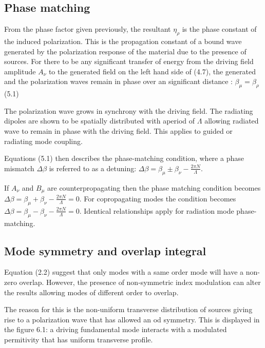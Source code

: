 \documentclass[11pt, openright]{book}
\begin{document}
         \subsection*{Phase matching}

         From the phase factor given previously, the resultant $\eta_\rho$ is the phase constant of the induced polarization. This is the propagation constant of a bound wave generated by the polarization response of the material due to the presence of sources. For there to be any significant transfer of energy from the driving field amplitude $A_\nu$ to the generated field on the left hand side of (4.7), the generated and the polarization waves remain in phase over an significant distance : $\beta_\mu = \beta_\rho$ (5.1)
         

         The polarization wave grows in synchrony with the driving field. The radiating dipoles are shown to be spatially distributed with  aperiod of $\Lambda$ allowing radiated wave to remain in phase with the driving field. This applies to guided or radiating mode coupling.

         Equations (5.1) then describes the phase-matching condition, where a phase mismatch $\Delta \beta$ is referred to as a detuning: $\Delta\beta=\beta_\mu \pm \beta_\nu - \frac{2 \pi N}{\Lambda}$.

         If $A_\nu$ and $B_\mu$ are counterpropagating then the phase matching condition becomes $\Delta\beta=\beta_\mu+\beta_\nu-\frac{2\pi N }{\Lambda}= 0$.
         For copropagating modes the condition becomes $\Delta\beta=\beta_\mu-\beta_\nu-\frac{2\pi N}{\Lambda}=0$.
         Identical relationships apply for radiation mode phase-matching.
         
          \subsection*{Mode symmetry and overlap integral}

          Equation (2.2) suggest that only modes with a same order mode will have a non-zero overlap. However, the presence of non-symmetric index modulation can alter the results allowing modes of different order to overlap.

          The reason for this is the non-uniform transverse distribution of sources giving rise to a polarization wave that has allowed an od symmetry. This is displayed in the figure 6.1: a driving fundamental mode interacts with a modulated permitivity that has uniform transverse profile. 
\end{document}
